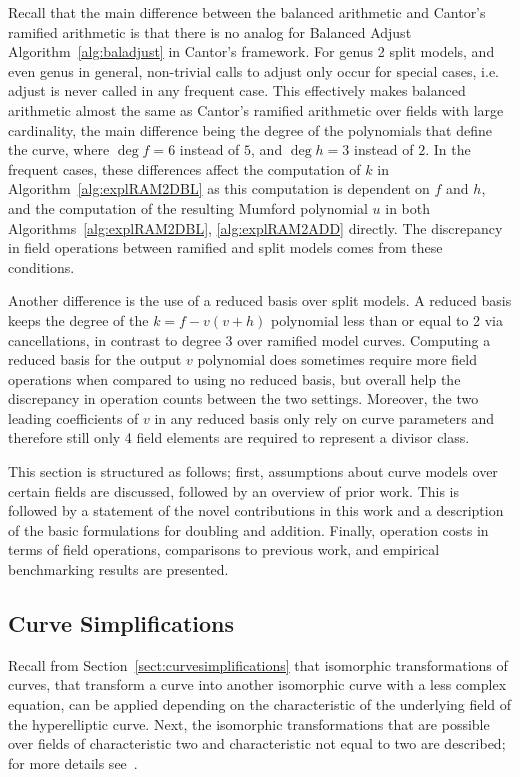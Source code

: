 Recall that the main difference between the balanced arithmetic and Cantor's
ramified arithmetic is that there is no analog for Balanced Adjust
Algorithm~\ref{alg:baladjust} in Cantor's framework. For genus 2 split models,
and even genus in general, non-trivial calls to adjust only occur for special
cases, i.e. adjust is never called in any frequent case. This effectively makes
balanced arithmetic almost the same as Cantor's ramified arithmetic over fields
with large cardinality, the main difference being the degree of the
polynomials that define the curve, where $\deg f = 6 $ instead of $5$, and $\deg
h  = 3$ instead of $2$. In the frequent cases, these differences affect the
computation of $k$ in Algorithm~\ref{alg:explRAM2DBL} as this computation is
dependent on $f$ and $h$, and the computation of the resulting Mumford
polynomial $u$ in both Algorithms~\ref{alg:explRAM2DBL}, \ref{alg:explRAM2ADD}
directly. The discrepancy in field operations between ramified and split models
comes from these conditions. 

Another difference is the use of a reduced basis over split models. A reduced
basis keeps the degree of the $k = f - v(v+h)$ polynomial less than or equal to
2 via cancellations, in contrast to degree 3 over ramified model curves.
Computing a reduced basis for the output $v$ polynomial does sometimes require
more field operations when compared to using no reduced basis, but overall help
the discrepancy in operation counts between the two settings. Moreover, the two
leading coefficients of $v$ in any reduced basis only rely on curve parameters
and therefore still only 4 field elements are required to represent a
divisor class. 

This section is structured as follows; first, assumptions about curve models
over certain fields are discussed, followed by an overview of prior work. This is
followed by a statement of the novel contributions in this work and a
description of the basic formulations for doubling and addition.
Finally, operation costs in terms of field operations, comparisons to previous
work, and empirical benchmarking results are presented.

\subsection{Curve Simplifications} 
\label{sect:splitcurvesimplifications}
Recall from Section~\ref{sect:curvesimplifications} that isomorphic
transformations of curves, that transform a curve into another isomorphic curve
with a less complex equation, can be applied depending on the characteristic of
the underlying field of the hyperelliptic curve. Next, the isomorphic
transformations that are possible over fields of characteristic two and characteristic not
equal to two are described; for more details
see~\cite[Section~3]{EricksonJacobsonStein_realg2_2011}.


